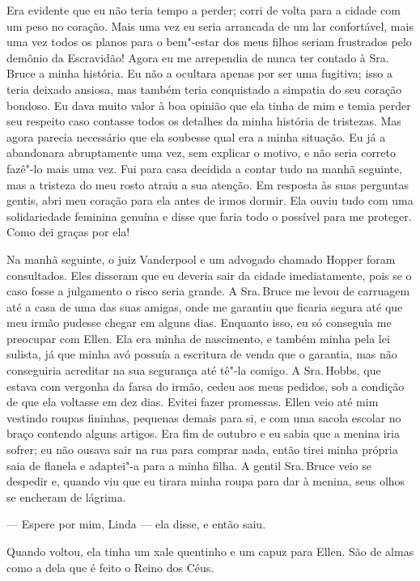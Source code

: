 Era evidente que eu não teria tempo a
perder; corri de volta para a cidade com um peso no coração. Mais uma
vez eu seria arrancada de um lar confortável, mais uma vez todos os
planos para o bem"-estar dos meus filhos seriam frustrados pelo demônio
da Escravidão! Agora eu me arrependia de nunca ter contado à Sra.\,Bruce
a minha história. Eu não a ocultara apenas por ser uma fugitiva; isso a
teria deixado ansiosa, mas também teria conquistado a simpatia do seu
coração bondoso. Eu dava muito valor à boa opinião que ela tinha de mim
e temia perder seu respeito caso contasse todos os detalhes da minha
história de tristezas. Mas agora parecia necessário que ela soubesse
qual era a minha situação. Eu já a abandonara abruptamente uma vez, sem
explicar o motivo, e não seria correto fazê"-lo mais uma vez. Fui para
casa decidida a contar tudo na manhã seguinte, mas a tristeza do meu
rosto atraiu a sua atenção. Em resposta às suas perguntas gentis, abri
meu coração para ela antes de irmos dormir. Ela ouviu tudo com uma
solidariedade feminina genuína e disse que faria todo o possível para me
proteger. Como dei graças por ela!

Na manhã seguinte, o juiz Vanderpool e
um advogado chamado Hopper foram consultados. Eles disseram que eu
deveria sair da cidade imediatamente, pois se o caso fosse a julgamento
o risco seria grande. A Sra.\,Bruce me levou de carruagem até a casa de
uma das suas amigas, onde me garantiu que ficaria segura até que meu
irmão pudesse chegar em alguns dias. Enquanto isso, eu só conseguia me
preocupar com Ellen. Ela era minha de nascimento, e também minha pela
lei sulista, já que minha avó possuía a escritura de venda que o
garantia, mas não conseguiria acreditar na sua segurança até tê"-la
comigo. A Sra.\,Hobbs, que estava com vergonha da farsa do irmão, cedeu
aos meus pedidos, sob a condição de que ela voltasse em dez dias. Evitei
fazer promessas. Ellen veio até mim vestindo roupas fininhas, pequenas
demais para si, e com uma sacola escolar no braço contendo alguns
artigos. Era fim de outubro e eu sabia que a menina iria sofrer; eu não
ousava sair na rua para comprar nada, então tirei minha própria saia de
flanela e adaptei"-a para a minha filha. A gentil Sra.\,Bruce veio se
despedir e, quando viu que eu tirara minha roupa para dar à menina, seus
olhos se encheram de lágrima.

--- Espere por mim, Linda --- ela disse, e então saiu.

Quando voltou, ela tinha um xale quentinho e um capuz para Ellen. São de
almas como a dela que é feito o Reino dos Céus.

